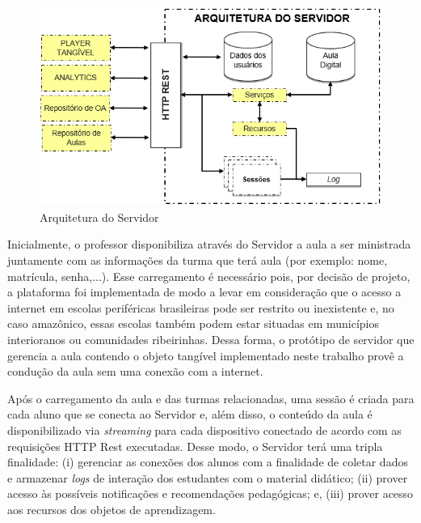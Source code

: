 
\begin{figure}[htbp]
	\centering
	\includegraphics[width=0.8\linewidth]{chapters/proposedMethod/arquitetura_servidor.png}
	\caption{Arquitetura do Servidor}
	\label{fig:servidor}
\end{figure}

Inicialmente, o professor disponibiliza através do Servidor a aula a ser ministrada juntamente com as informações da turma que terá aula (por exemplo: nome, matrícula, senha,...). Esse carregamento é necessário pois, por decisão de projeto, a plataforma foi implementada de modo a levar em consideração que o acesso a internet em escolas periféricas brasileiras pode ser restrito ou inexistente e, no caso amazônico, essas escolas também podem estar situadas em municípios interioranos ou comunidades ribeirinhas. Dessa forma, o protótipo de servidor que gerencia a aula contendo o objeto tangível implementado neste trabalho provê a condução da aula sem uma conexão com a internet.

Após o carregamento da aula e das turmas relacionadas, uma sessão é criada para cada aluno que se conecta ao Servidor e, além disso, o conteúdo da aula é disponibilizado via \textit{streaming} para cada dispositivo conectado de acordo com as requisições HTTP Rest executadas. Desse modo, o Servidor terá uma tripla finalidade: (i) gerenciar as conexões dos alunos com a finalidade de coletar dados e armazenar \textit{logs} de interação dos estudantes com o material didático; (ii) prover acesso às possíveis notificações e recomendações pedagógicas; e, (iii) prover acesso aos recursos dos objetos de aprendizagem.

